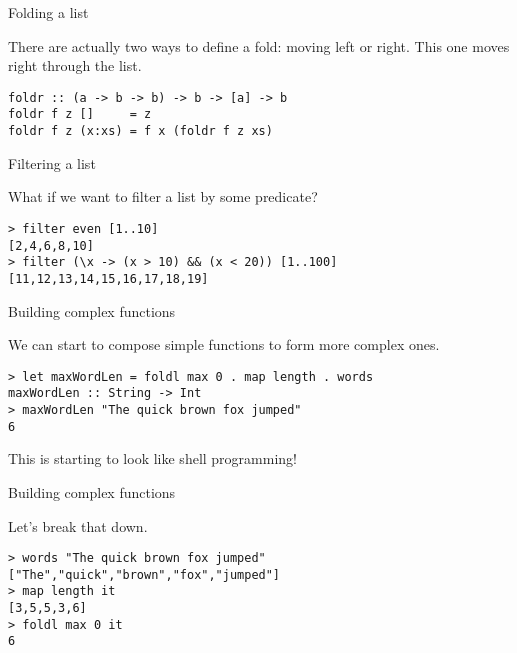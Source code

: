 %
\begin{frame}[fragile]{Folding a list}

There are actually two ways to define a fold: moving left or right. This one
moves right through the list.

\begin{block}{}
\begin{verbatim}
foldr :: (a -> b -> b) -> b -> [a] -> b
foldr f z []     = z 
foldr f z (x:xs) = f x (foldr f z xs)
\end{verbatim}
\end{block}

\end{frame}

%
\begin{frame}[fragile]{Filtering a list}

What if we want to filter a list by some predicate?

\begin{block}{}
\begin{verbatim}
> filter even [1..10]
[2,4,6,8,10]
> filter (\x -> (x > 10) && (x < 20)) [1..100]
[11,12,13,14,15,16,17,18,19]
\end{verbatim}
\end{block}

\end{frame}

%
\begin{frame}[fragile]{Building complex functions}

We can start to compose simple functions to form more complex ones.

\begin{block}{}
\begin{verbatim}
> let maxWordLen = foldl max 0 . map length . words
maxWordLen :: String -> Int
> maxWordLen "The quick brown fox jumped"
6
\end{verbatim}
\end{block}

This is starting to look like shell programming!

\end{frame}

%
\begin{frame}[fragile]{Building complex functions}

Let's break that down.

\begin{block}{}
\begin{verbatim}
> words "The quick brown fox jumped"
["The","quick","brown","fox","jumped"]
> map length it
[3,5,5,3,6]
> foldl max 0 it
6
\end{verbatim}
\end{block}

\end{frame}

